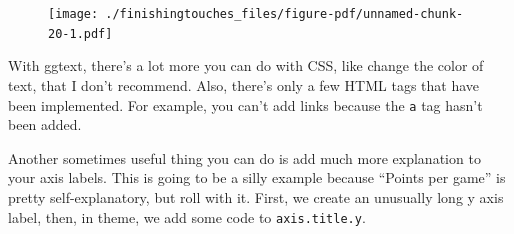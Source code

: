 \documentclass[
  letterpaper,
  DIV=11,
  numbers=noendperiod]{scrreprt}
\begin{document}
\begin{figure}[H]

{\centering \texttt{[image: ./finishingtouches\_files/figure-pdf/unnamed-chunk-20-1.pdf]}

}

\end{figure}

With ggtext, there's a lot more you can do with CSS, like change the
color of text, that I don't recommend. Also, there's only a few HTML
tags that have been implemented. For example, you can't add links
because the \texttt{a} tag hasn't been added.

Another sometimes useful thing you can do is add much more explanation
to your axis labels. This is going to be a silly example because
``Points per game'' is pretty self-explanatory, but roll with it. First,
we create an unusually long y axis label, then, in theme, we add some
code to \texttt{axis.title.y}.
\end{document}
